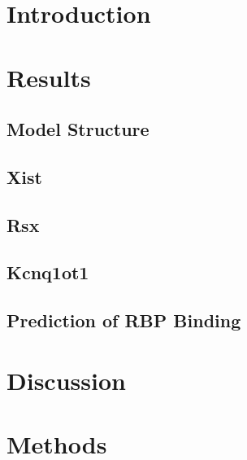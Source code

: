 \section{Introduction}
\section{Results}
\lipsum[1-2]
\subsection{Model Structure}
\lipsum[1-2]
\subsection{Xist}
\lipsum[1-2]
\subsection{Rsx} 
\lipsum[1-2]
\subsection{Kcnq1ot1}
\lipsum[1-2]
\subsection{Prediction of RBP Binding}
\lipsum[1-2]

\section{Discussion}
\lipsum[1-2]
\section{Methods}
\lipsum[1-2]